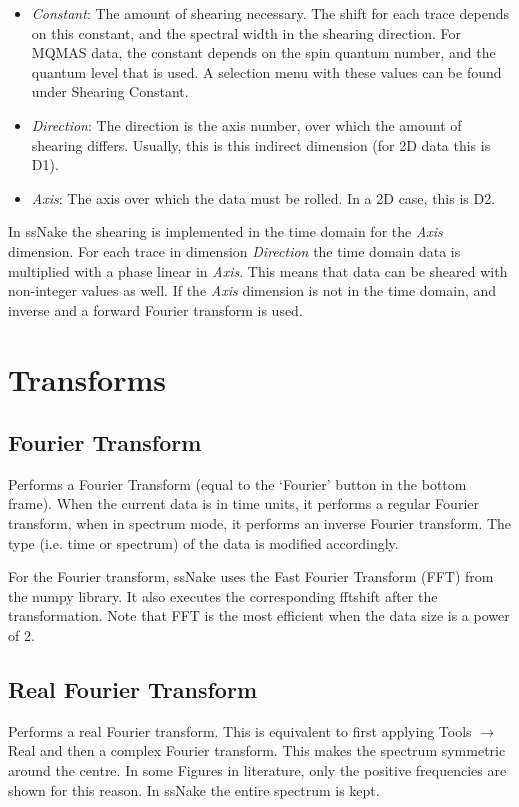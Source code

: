 \documentclass[11pt,a4paper]{article}
\begin{document}
\begin{itemize}
  \item \textit{Constant}: The amount of shearing necessary. The shift for each trace depends on this constant, and the spectral width in the shearing direction.
	 For MQMAS data, the constant depends on the spin quantum number, and the quantum level that is used. A selection menu with these values can be found under Shearing Constant.
  \item \textit{Direction}: The direction is the axis number, over which the amount of shearing differs. Usually, this is this indirect dimension (for 2D data this is D1).
  \item \textit{Axis}: The axis over which the data must be rolled. In a 2D case, this is D2.
\end{itemize}

In ssNake the shearing is implemented in the time domain for the \textit{Axis} dimension.
For each trace in dimension \textit{Direction} the time domain data is multiplied with a phase linear in \textit{Axis}.
This means that data can be sheared with non-integer values as well.
If the \textit{Axis} dimension is not in the time domain, and inverse and a forward Fourier transform is used.

\section{Transforms}
\subsection{Fourier Transform}
Performs a Fourier Transform (equal to the `Fourier' button in the bottom frame).
When the current data is in time units, it performs a regular Fourier transform, when in spectrum mode, it performs an inverse Fourier transform.
The type (i.e. time or spectrum) of the data is modified accordingly.

For the Fourier transform, ssNake uses the Fast Fourier Transform (FFT) from the numpy library.
It also executes the corresponding fftshift after the transformation.
Note that FFT is the most efficient when the data size is a power of 2.


\subsection{Real Fourier Transform}
Performs a real Fourier transform.
This is equivalent to first applying Tools $\rightarrow$ Real and then a complex Fourier transform.
This makes the spectrum symmetric around the centre.
In some Figures in literature, only the positive frequencies are shown for this reason.
In ssNake the entire spectrum is kept.
\end{document}
